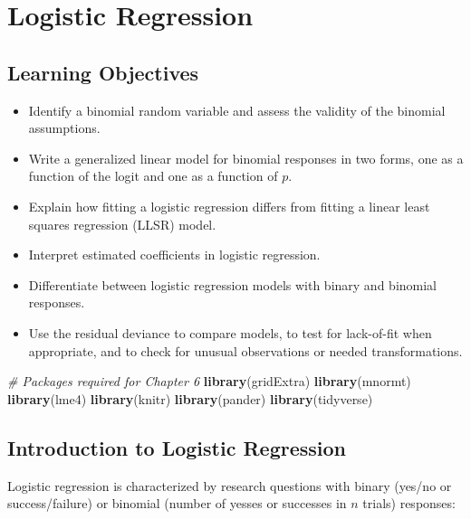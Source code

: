 \documentclass[
]{krantz}
\newenvironment{Shaded}{\begin{snugshade}}{\end{snugshade}}
\newcommand{\CommentTok}[1]{\textcolor[rgb]{0.37,0.37,0.37}{\textit{#1}}}
\newcommand{\KeywordTok}[1]{\textcolor[rgb]{0.27,0.27,0.27}{\textbf{#1}}}
\newcommand{\NormalTok}[1]{#1}
\providecommand{\tightlist}{%
  \setlength{\itemsep}{0pt}\setlength{\parskip}{0pt}}
\begin{document}
\hypertarget{ch-logreg}{%
\chapter{Logistic Regression}\label{ch-logreg}}

\hypertarget{learning-objectives-5}{%
\section{Learning Objectives}\label{learning-objectives-5}}

\begin{itemize}
\tightlist
\item
  Identify a binomial random variable and assess the validity of the binomial assumptions.
\item
  Write a generalized linear model for binomial responses in two forms, one as a function of the logit and one as a function of \(p\).
\item
  Explain how fitting a logistic regression differs from fitting a linear least squares regression (LLSR) model.
\item
  Interpret estimated coefficients in logistic regression.
\item
  Differentiate between logistic regression models with binary and binomial responses.
\item
  Use the residual deviance to compare models, to test for lack-of-fit when appropriate, and to check for unusual observations or needed transformations.
\end{itemize}

\begin{Shaded}
\begin{Highlighting}[]
\CommentTok{# Packages required for Chapter 6}
\KeywordTok{library}\NormalTok{(gridExtra)  }
\KeywordTok{library}\NormalTok{(mnormt) }
\KeywordTok{library}\NormalTok{(lme4) }
\KeywordTok{library}\NormalTok{(knitr) }
\KeywordTok{library}\NormalTok{(pander)}
\KeywordTok{library}\NormalTok{(tidyverse)}
\end{Highlighting}
\end{Shaded}

\hypertarget{introduction-to-logistic-regression}{%
\section{Introduction to Logistic Regression}\label{introduction-to-logistic-regression}}

Logistic regression is characterized by research questions with binary (yes/no or success/failure) or binomial (number of yesses or successes in \(n\) trials) responses:
\end{document}

